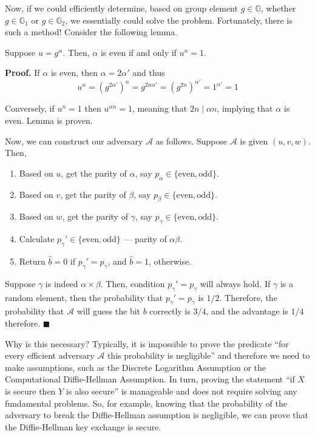 \documentclass[../lecture-notes.tex]{subfiles}
\begin{document}
Now, if we could efficiently determine, based on group element $g \in \mathbb{G}$, whether $g \in \mathbb{G}_1$ or $g \in \mathbb{G}_2$, we essentially could solve the problem. Fortunately, there is such a method! Consider the following lemma.

\begin{lemma}
    Suppose $u=g^{\alpha}$. Then, $\alpha$ is even if and only if $u^n = 1$.
\end{lemma}

\textbf{Proof.} If $\alpha$ is even, then $\alpha = 2\alpha'$ and thus
\begin{equation}
    u^n = (g^{2\alpha'})^n = g^{2n\alpha'} = (g^{2n})^{\alpha'} = 1^{\alpha'} = 1
\end{equation}

Conversely, if $u^n = 1$ then $u^{\alpha n}=1$, meaning that $2n \mid \alpha n$, implying that $\alpha$ is even. Lemma is proven.

Now, we can construct our adversary $\mathcal{A}$ as follows. Suppose $\mathcal{A}$ is given $(u,v,w)$. Then,
\begin{enumerate}
    \item Based on $u$, get the parity of $\alpha$, say $p_{\alpha} \in \{\text{even}, \text{odd}\}$.
    \item Based on $v$, get the parity of $\beta$, say $p_{\beta} \in \{\text{even}, \text{odd}\}$.
    \item Based on $w$, get the parity of $\gamma$, say $p_{\gamma} \in \{\text{even}, \text{odd}\}$.
    \item Calculate $p_{\gamma}'\in \{\text{even}, \text{odd}\}$ --- parity of $\alpha\beta$.
    \item Return $\hat{b}=0$ if $p_{\gamma}' = p_{\gamma}$, and $\hat{b}=1$, otherwise.
\end{enumerate}

Suppose $\gamma$ is indeed $\alpha \times \beta$. Then, condition $p_{\gamma}'=p_{\gamma}$ will always hold. If $\gamma$ is a random element, then the probability that $p_{\gamma}'=p_{\gamma}$ is $1/2$. Therefore, the probability that $\mathcal{A}$ will guess the bit $b$ correctly is $3/4$, and the advantage is $1/4$ therefore. $\blacksquare$

Why is this necessary? Typically, it is impossible to prove the predicate ``for every efficient adversary $\mathcal{A}$ this probability is negligible'' and therefore we need to make assumptions, such as the Discrete Logarithm Assumption or the Computational Diffie-Hellman Assumption. In turn, proving the statement ``if $X$ is secure then $Y$ is also secure'' is manageable and does not require solving any fundamental problems. So, for example,
knowing that the probability of the adversary to break the Diffie-Hellman assumption is negligible, we can prove that the Diffie-Hellman key exchange is secure. 
\end{document}
